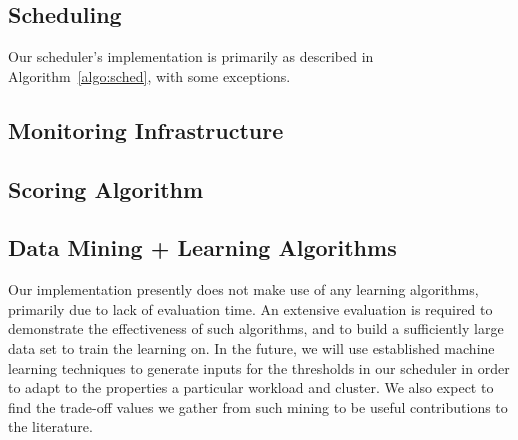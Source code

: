 \subsection{Scheduling}

Our scheduler's implementation is primarily as described in
Algorithm~\ref{algo:sched}, with some exceptions.

\subsection{Monitoring Infrastructure}


\subsection{Scoring Algorithm}


\subsection{Data Mining + Learning Algorithms}

Our implementation presently does not make use of any learning algorithms,
primarily due to lack of evaluation time.  An extensive evaluation is required
to demonstrate the effectiveness of such algorithms, and to build a sufficiently
large data set to train the learning on.  In the future, we will use established
machine learning techniques to generate inputs for the thresholds in our
scheduler in order to adapt to the properties a particular workload and cluster.
We also expect to find the trade-off values we gather from such mining to be
useful contributions to the literature.

